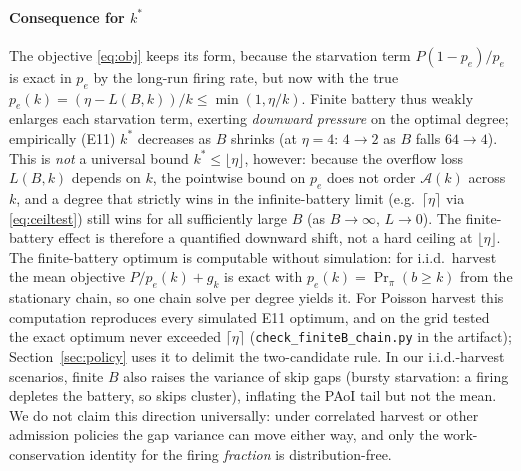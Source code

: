 \documentclass[twocolumn,3p,times,procedia]{elsarticle}
\theoremstyle{plain}
\theoremstyle{remark}
\newcommand{\Prob}{\Pr}
\newcommand{\peff}{p_e}
\newcommand{\kstar}{k^{\ast}}
\begin{document}
\paragraph*{Consequence for $\kstar$}
The objective \eqref{eq:obj} keeps its form, because the starvation term
$P(1-\peff)/\peff$ is exact in $\peff$ by the long-run firing
rate, but now with
the true $\peff(k)=(\eta-L(B,k))/k\le\min(1,\eta/k)$. Finite battery thus
weakly enlarges each starvation term, exerting \emph{downward pressure} on
the optimal degree; empirically (E11) $\kstar$
decreases as $B$ shrinks (at $\eta{=}4$: $4\to2$ as $B$ falls
$64\to4$). This is \emph{not} a universal bound
$\kstar\le\lfloor\eta\rfloor$, however: because the overflow loss
$L(B,k)$ depends on $k$, the pointwise bound on $\peff$ does not order
$\mathcal{A}(k)$ across $k$, and a degree that strictly wins in the
infinite-battery limit (e.g.\ $\lceil\eta\rceil$ via \eqref{eq:ceiltest})
still wins for all sufficiently large $B$ (as $B\to\infty$, $L\to0$). The
finite-battery effect is therefore a quantified downward shift, not a hard
ceiling at $\lfloor\eta\rfloor$. The finite-battery optimum is computable
without simulation: for i.i.d.\ harvest the mean objective
$P/\peff(k)+g_k$ is exact with $\peff(k)=\Prob_\pi(b\ge k)$ from the
stationary chain, so one chain solve per degree yields it. For Poisson
harvest this computation reproduces every simulated E11 optimum, and on
the grid tested the exact optimum never exceeded $\lceil\eta\rceil$
(\texttt{check\_finiteB\_chain.py} in the artifact);
Section~\ref{sec:policy} uses it to delimit the two-candidate rule. In
our i.i.d.-harvest scenarios, finite
$B$ also raises the variance of skip gaps (bursty starvation: a firing
depletes the battery, so skips cluster), inflating the PAoI tail but not
the mean. We do not claim this direction universally: under correlated
harvest or other admission policies the gap variance can move either
way, and only the work-conservation identity for the firing
\emph{fraction} is distribution-free.
\end{document}
